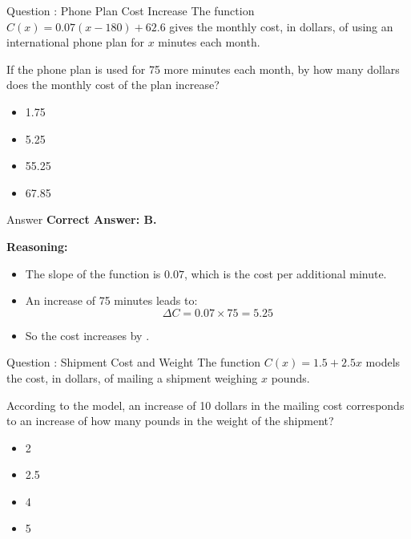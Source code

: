 \documentclass{beamer}
\begin{document}
\begin{frame}{Question : Phone Plan Cost Increase}
The function \( C(x) = 0.07(x - 180) + 62.6 \) gives the monthly cost, in dollars, of using an international phone plan for \( x \) minutes each month.

\vspace{0.5em}
If the phone plan is used for 75 more minutes each month, by how many dollars does the monthly cost of the plan increase?

\begin{itemize}
    \item[\textbf{A.}] 1.75
    \item[\textbf{B.}] 5.25
    \item[\textbf{C.}] 55.25
    \item[\textbf{D.}] 67.85
\end{itemize}
\end{frame}

\begin{frame}{Answer }
\textbf{Correct Answer: \textcolor{novelPurple}{B.}}

\vspace{0.5em}
\textbf{Reasoning:}
\begin{itemize}
    \item The slope of the function is \( 0.07 \), which is the cost per additional minute.
    \item An increase of 75 minutes leads to:
    \[
    \Delta C = 0.07 \times 75 = 5.25
    \]
    \item So the cost increases by .
\end{itemize}
\end{frame}

\begin{frame}{Question : Shipment Cost and Weight}
The function \( C(x) = 1.5 + 2.5x \) models the cost, in dollars, of mailing a shipment weighing \( x \) pounds.

\vspace{0.5em}
According to the model, an increase of 10 dollars in the mailing cost corresponds to an increase of how many pounds in the weight of the shipment?

\begin{itemize}
    \item[\textbf{A.}] 2
    \item[\textbf{B.}] 2.5
    \item[\textbf{C.}] 4
    \item[\textbf{D.}] 5
\end{itemize}
\end{frame}
\end{document}
